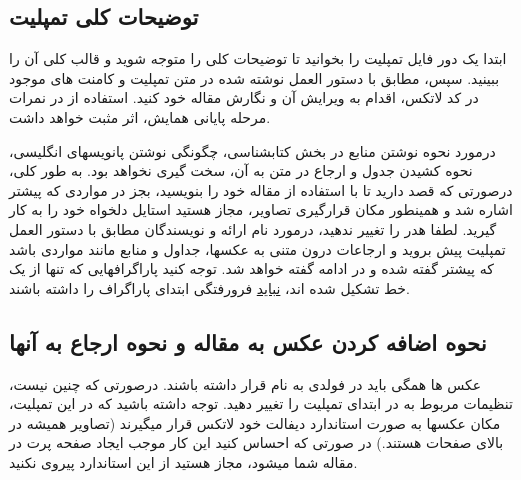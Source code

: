 \documentclass[twoside]{article}
\newcommand{\عنوان}{عنوان ارائه}
\newcommand{\نام}{نام و نام خانوادگی}
\newcommand{\رشته}{رشته}
\newcommand{\دانشگاه}{دانشگاه}
\newcommand{\همکار}{نام و نام خانوادگی همکار}
\begin{document}
\subsection{توضیحات کلی تمپلیت}
ابتدا یک دور فایل  تمپلیت را بخوانید تا توضیحات کلی را متوجه شوید و قالب کلی آن را ببینید. سپس، مطابق با دستور العمل نوشته شده در متن تمپلیت و کامنت های موجود در کد لاتکس، اقدام به ویرایش آن و نگارش مقاله خود کنید. استفاده از \lr{\LaTeX} در نمرات مرحله پایانی همایش، اثر مثبت خواهد داشت.

درمورد نحوه نوشتن منابع در بخش کتابشناسی، چگونگی نوشتن پانویسهای انگلیسی، نحوه کشیدن جدول و ارجاع در متن به آن، سخت گیری نخواهد بود. به طور کلی، درصورتی که قصد دارید تا با استفاده از \lr{\LaTeX} مقاله خود را بنویسید، بجز در مواردی که پیشتر اشاره شد و همینطور مکان قرارگیری تصاویر، مجاز هستید استایل دلخواه خود را به کار گیرید. لطفا هدر را تغییر ندهید، درمورد نام ارائه و نویسندگان مطابق با دستور العمل تمپلیت پیش بروید و ارجاعات درون متنی به عکسها، جداول و منابع مانند مواردی باشد که پیشتر گفته شده و در ادامه گفته خواهد شد. توجه کنید پاراگرافهایی که تنها از یک خط تشکیل شده اند، \underline{نباید} فرورفتگی ابتدای پاراگراف را داشته باشند.
\subsection{نحوه اضافه کردن عکس به مقاله و نحوه ارجاع به آنها}
عکس ها همگی باید در فولدی به نام  قرار داشته باشند. درصورتی که چنین نیست، تنظیمات مربوط به  در ابتدای تمپلیت را تغییر دهید. توجه داشته باشید که در این تمپلیت، مکان عکسها به صورت استاندارد دیفالت خود لاتکس قرار میگیرند (تصاویر همیشه در بالای صفحات هستند.) در صورتی که احساس کنید این کار موجب ایجاد صفحه پرت در مقاله شما میشود، مجاز هستید از این استاندارد پیروی نکنید.
\end{document}
